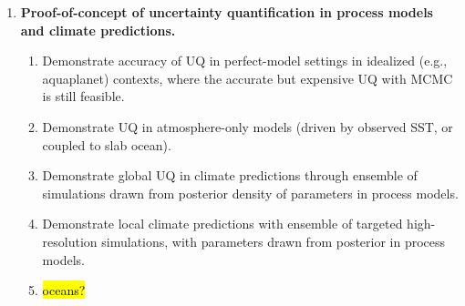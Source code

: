 \documentclass{article}
\begin{document}
\begin{enumerate}
    
    \item \textbf{Proof-of-concept of uncertainty quantification in process models and climate predictions.}
    \begin{enumerate}
        \item Demonstrate accuracy of UQ in perfect-model settings in idealized (e.g., aquaplanet) contexts, where the accurate but expensive UQ with MCMC is still feasible. 
        \item Demonstrate UQ in atmosphere-only models (driven by observed SST, or coupled to slab ocean).
        \item Demonstrate global UQ in climate predictions through ensemble of simulations drawn from posterior density of parameters in process models.
        \item Demonstrate local climate predictions with ensemble of targeted high-resolution simulations, with parameters drawn from posterior in process models.
        \item \hl{oceans?}
    \end{enumerate}
\end{enumerate}

\clearpage


\end{document}
